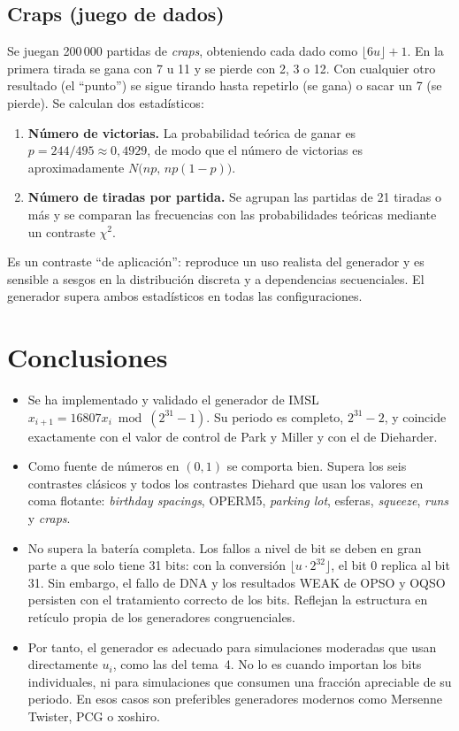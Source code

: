 \documentclass[a4paper,11pt]{article}
\begin{document}
\subsection{Craps (juego de dados)}

Se juegan 200\,000 partidas de \emph{craps}, obteniendo cada dado como
$\lfloor 6u \rfloor + 1$. En la primera tirada se gana con 7 u 11 y se pierde con
2, 3 o 12. Con cualquier otro resultado (el \enquote{punto}) se sigue tirando
hasta repetirlo (se gana) o sacar un 7 (se pierde). Se calculan dos estadísticos:
\begin{enumerate}
  \item \textbf{Número de victorias.} La probabilidad teórica de ganar es
        $p=244/495\approx0{,}4929$, de modo que el número de victorias es
        aproximadamente $N\big(np,\, np(1-p)\big)$.
  \item \textbf{Número de tiradas por partida.} Se agrupan las partidas de 21
        tiradas o más y se comparan las frecuencias con las probabilidades
        teóricas mediante un contraste $\chi^2$.
\end{enumerate}
Es un contraste \enquote{de aplicación}: reproduce un uso realista del generador
y es sensible a sesgos en la distribución discreta y a dependencias
secuenciales. El generador supera ambos estadísticos en todas las
configuraciones.

\section{Conclusiones}\label{sec:conclusiones}

\begin{itemize}
  \item Se ha implementado y validado el generador de IMSL
        $x_{i+1}=16807x_i \bmod (2^{31}-1)$. Su periodo es completo,
        $2^{31}-2$, y coincide exactamente con el valor de control de Park y
        Miller y con el  de Dieharder.
  \item Como fuente de números en $(0,1)$ se comporta bien. Supera los seis
        contrastes clásicos y todos los contrastes Diehard que usan los valores
        en coma flotante: \emph{birthday spacings}, OPERM5, \emph{parking lot},
        esferas, \emph{squeeze}, \emph{runs} y \emph{craps}.
  \item No supera la batería completa. Los fallos a nivel de bit se deben en
        gran parte a que solo tiene 31 bits: con la conversión
        $\lfloor u\cdot2^{32}\rfloor$, el bit 0 replica al bit 31. Sin embargo, el
        fallo de DNA y los resultados WEAK de OPSO y OQSO persisten con el
        tratamiento correcto de los bits. Reflejan la estructura en retículo
        propia de los generadores congruenciales.
  \item Por tanto, el generador es adecuado para simulaciones moderadas que usan
        directamente $u_i$, como las del tema~4. No lo es cuando importan los
        bits individuales, ni para simulaciones que consumen una fracción
        apreciable de su periodo. En esos casos son preferibles generadores
        modernos como Mersenne Twister, PCG o xoshiro.
\end{itemize}
\end{document}
